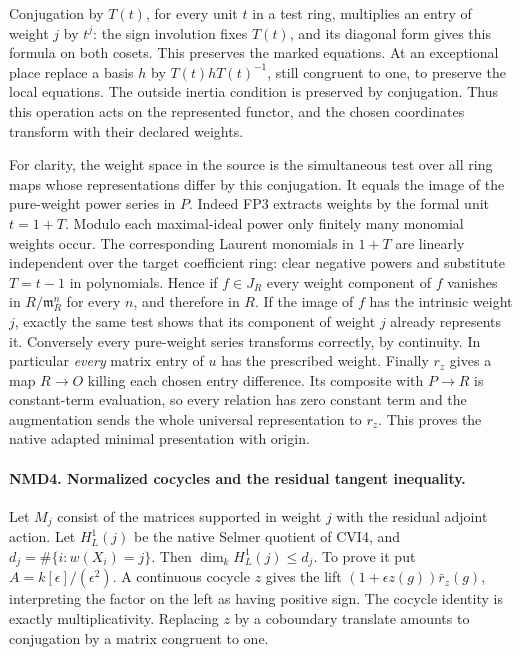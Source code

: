 Conjugation by $T(t)$, for every unit $t$ in a test ring, multiplies
an entry of weight $j$ by $t^j$: the sign involution fixes $T(t)$,
and its diagonal form gives this formula on both cosets. This
preserves the marked equations. At an exceptional place replace a
basis $h$ by $T(t)hT(t)^{-1}$, still congruent to one, to preserve
the local equations. The outside inertia condition is preserved by
conjugation. Thus this operation acts on the represented functor,
and the chosen coordinates transform with their declared weights.

For clarity, the weight space in the source is the simultaneous test
over all ring maps whose representations differ by this conjugation.
It equals the image of the pure-weight power series in $P$.
Indeed FP3 extracts weights by the formal unit $t=1+T$.
Modulo each maximal-ideal power only finitely many monomial weights
occur. The corresponding Laurent monomials in $1+T$ are linearly
independent over the target coefficient ring: clear negative
powers and substitute $T=t-1$ in polynomials. Hence if $f\in J_R$
every weight component of $f$ vanishes in $R/\mathfrak m_R^n$
for every $n$, and therefore in $R$. If the image of $f$ has
the intrinsic weight $j$, exactly the same test shows that
its component of weight $j$ already represents it. Conversely
every pure-weight series transforms correctly, by continuity.
In particular \emph{every} matrix entry of $u$ has the prescribed
weight. Finally $r_z$ gives a map $R\to O$ killing each chosen
entry difference. Its composite with $P\to R$ is constant-term
evaluation, so every relation has zero constant term and the
augmentation sends the whole universal representation to $r_z$.
This proves the native adapted minimal presentation with origin.

\paragraph{NMD4. Normalized cocycles and the residual tangent inequality.}
\label{claim:NMD4}
Let $M_j$ consist of the matrices supported in weight $j$ with the
residual adjoint action. Let $H^1_L(j)$ be the native Selmer
quotient of CVI4, and $d_j=\#\{i:w(X_i)=j\}$. Then
$\dim_k H^1_L(j)\le d_j$. To prove it put $A=k[\epsilon]/(\epsilon^2)$.
A continuous cocycle $z$ gives the lift
$(1+\epsilon z(g))\bar r_z(g)$, interpreting the factor on the left
as having positive sign. The cocycle identity is exactly
multiplicativity. Replacing $z$ by a coboundary translate amounts to
conjugation by a matrix congruent to one.


